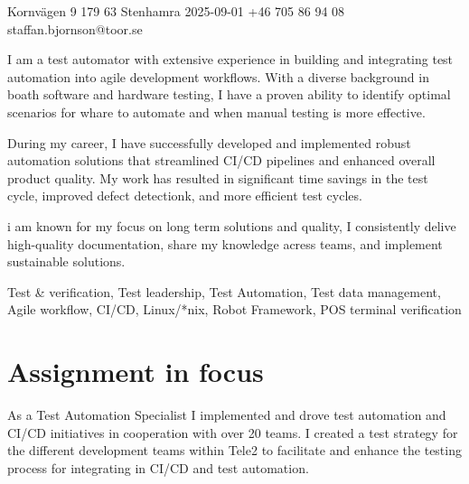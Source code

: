 \documentclass{sobCV}[2015/09/08]
\begin{document}
{Kornvägen 9}
{179 63 Stenhamra}
{2025-09-01}
{+46 705 86 94 08}
{staffan.bjornson@toor.se}






{
	I am a test automator with extensive experience in building and
	integrating test automation into agile development workflows. With a
	diverse background in boath software and hardware testing, I have a
	proven ability to identify optimal scenarios for whare to automate and
	when manual testing is more effective.

	During my career, I have successfully developed and implemented robust
	automation solutions that streamlined CI/CD pipelines and enhanced
	overall product quality. My work has resulted in significant time
	savings in the test cycle, improved defect detectionk, and more
	efficient test cycles.

	i am known for my focus on long term solutions and quality, I
	consistently delive high-quality documentation, share my knowledge
	acress teams, and implement sustainable solutions.
}{
	Test \& verification,
	Test leadership,
	Test Automation,
	Test data management,
	Agile workflow,
	CI/CD,
	Linux/*nix,
	Robot Framework,
	POS terminal verification
}


\section{Assignment in focus}
As a Test Automation Specialist I implemented and drove test automation and
CI/CD initiatives in cooperation with over 20 teams. I created a test
strategy for the different development teams within Tele2 to facilitate and
enhance the testing process for integrating in CI/CD and test automation.
\end{document}

